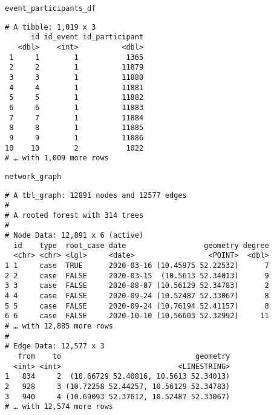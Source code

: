 \documentclass[
  8pt,
  ignorenonframetext,
]{beamer}
\begin{document}
\begin{frame}[fragile]
\texttt{event\_participants\_df}

\vspace{0.2cm}

\tiny

\begin{verbatim}
# A tibble: 1,019 x 3
      id id_event id_participant
   <dbl>    <int>          <dbl>
 1     1        1           1365
 2     2        1          11879
 3     3        1          11880
 4     4        1          11881
 5     5        1          11882
 6     6        1          11883
 7     7        1          11884
 8     8        1          11885
 9     9        1          11886
10    10        2           1022
# … with 1,009 more rows
\end{verbatim}

\normalsize
\end{frame}

\begin{frame}[fragile]
\texttt{network\_graph}

\vspace{0.2cm}

\tiny

\begin{verbatim}
# A tbl_graph: 12891 nodes and 12577 edges
#
# A rooted forest with 314 trees
#
# Node Data: 12,891 x 6 (active)
  id    type  root_case date                  geometry degree
  <chr> <chr> <lgl>     <date>                 <POINT>  <dbl>
1 1     case  TRUE      2020-03-16 (10.45975 52.22532)      7
2 2     case  FALSE     2020-03-15  (10.5613 52.34013)      9
3 3     case  FALSE     2020-08-07 (10.56129 52.34783)      2
4 4     case  FALSE     2020-09-24 (10.52487 52.33067)      8
5 5     case  FALSE     2020-09-24 (10.76194 52.41157)      8
6 6     case  FALSE     2020-10-10 (10.56603 52.32992)     11
# … with 12,885 more rows
#
# Edge Data: 12,577 x 3
   from    to                               geometry
  <int> <int>                           <LINESTRING>
1   834     2  (10.66729 52.40816, 10.5613 52.34013)
2   928     3 (10.72258 52.44257, 10.56129 52.34783)
3   940     4 (10.69093 52.37612, 10.52487 52.33067)
# … with 12,574 more rows
\end{verbatim}

\normalsize
\end{frame}
\end{document}
